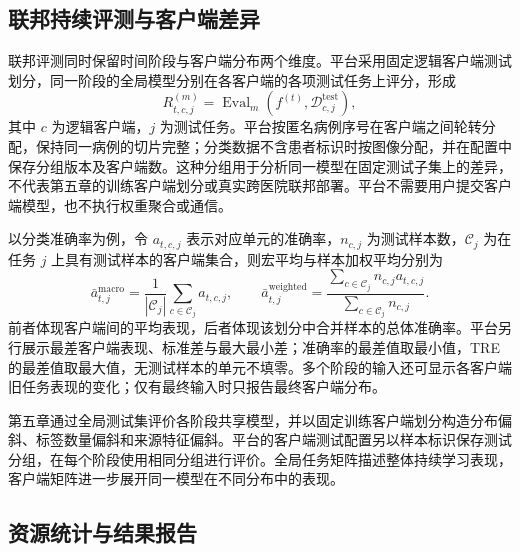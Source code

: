 \subsection{联邦持续评测与客户端差异}
\label{subsec:medcl-federated-evaluation}

联邦评测同时保留时间阶段与客户端分布两个维度。平台采用固定逻辑客户端测试划分，同一阶段的全局模型分别在各客户端的各项测试任务上评分，形成
\begin{equation}
R^{(m)}_{t,c,j}=\operatorname{Eval}_m\!\left(f^{(t)},\mathcal D^{\mathrm{test}}_{c,j}\right),
\label{eq:medcl-federated-cube}
\end{equation}
其中 $c$ 为逻辑客户端，$j$ 为测试任务。平台按匿名病例序号在客户端之间轮转分配，保持同一病例的切片完整；分类数据不含患者标识时按图像分配，并在配置中保存分组版本及客户端数。这种分组用于分析同一模型在固定测试子集上的差异，不代表第五章的训练客户端划分或真实跨医院联邦部署。平台不需要用户提交客户端模型，也不执行权重聚合或通信。

以分类准确率为例，令 $a_{t,c,j}$ 表示对应单元的准确率，$n_{c,j}$ 为测试样本数，$\mathcal C_j$ 为在任务 $j$ 上具有测试样本的客户端集合，则宏平均与样本加权平均分别为
\begin{equation}
\bar a^{\mathrm{macro}}_{t,j}=\frac{1}{|\mathcal C_j|}\sum_{c\in\mathcal C_j}a_{t,c,j},
\qquad
\bar a^{\mathrm{weighted}}_{t,j}=\frac{\sum_{c\in\mathcal C_j}n_{c,j}a_{t,c,j}}{\sum_{c\in\mathcal C_j}n_{c,j}}.
\label{eq:medcl-client-aggregation}
\end{equation}
前者体现客户端间的平均表现，后者体现该划分中合并样本的总体准确率。平台另行展示最差客户端表现、标准差与最大最小差；准确率的最差值取最小值，TRE 的最差值取最大值，无测试样本的单元不填零。多个阶段的输入还可显示各客户端旧任务表现的变化；仅有最终输入时只报告最终客户端分布。

第五章通过全局测试集评价各阶段共享模型，并以固定训练客户端划分构造分布偏斜、标签数量偏斜和来源特征偏斜。平台的客户端测试配置另以样本标识保存测试分组，在每个阶段使用相同分组进行评价。全局任务矩阵描述整体持续学习表现，客户端矩阵进一步展开同一模型在不同分布中的表现。

\subsection{资源统计与结果报告}
\label{subsec:medcl-resource-reporting}


